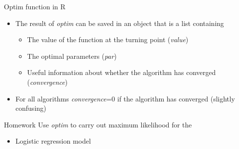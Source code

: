 \documentclass[10pt]{beamer}
\begin{document}
                                                                                              \begin{frame}{Optim function in R}
                                                                                                \begin{itemize}
                                                                                                \item The result of {\em optim} can be saved in an object that is a list containing
                                                                                                  \begin{itemize}
                                                                                                  \item The value of the  function at the turning point ({\em value})
                                                                                                  \item The optimal parameters ({\em par})
                                                                                                  \item Useful information about whether the algorithm has converged ({\em convergence})
                                                                                                  \end{itemize}
                                                                                                \item For all algorithms {\em convergence}=0 if the algorithm has converged (slightly confusing)
                                                                                                \end{itemize}
                                                                                              \end{frame}
                                                                                              \begin{frame}{Homework}
                                                                                                Use {\em optim} to carry out maximum likelihood for the
                                                                                                \begin{itemize}
                                                                                                \item Logistic regression model
                                                                                                \end{itemize}
                                                                                              \end{frame}
\end{document}
